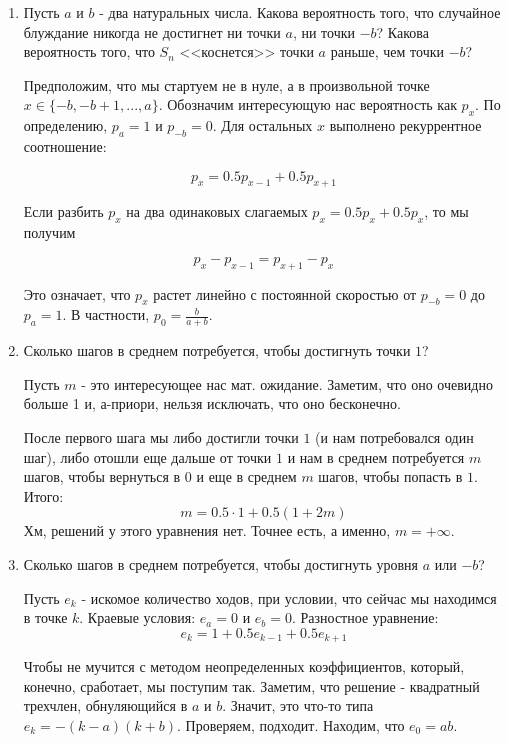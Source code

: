 {\begin{enumerate}
\item Пусть $a$ и $b$ - два натуральных числа. Какова вероятность того, что случайное блуждание никогда не достигнет ни точки $a$, ни точки $-b$? Какова вероятность того, что $S_{n}$ <<коснется>> точки $a$ раньше, чем точки $-b$? 

Предположим, что мы стартуем не в нуле, а в произвольной точке $ x\in\{-b,-b+1,..., a\} $. Обозначим интересующую нас вероятность как $ p_{x} $. По определению, $ p_{a}=1 $ и $ p_{-b}=0 $. Для остальных $ x $ выполнено рекуррентное соотношение: 

\[ p_{x}=0.5p_{x-1}+0.5p_{x+1} \]

Если разбить $ p_{x} $ на два одинаковых слагаемых $ p_{x}=0.5p_{x}+0.5p_{x} $, то мы получим 

\[ p_{x}-p_{x-1}=p_{x+1}-p_{x} \]

Это означает, что $ p_{x} $ растет линейно с постоянной скоростью от $ p_{-b}=0 $ до $ p_{a}=1 $. В частности, $ p_{0}=\frac{b}{a+b} $.


\item Сколько шагов в среднем потребуется, чтобы достигнуть точки $1$?

Пусть $m$ - это интересующее нас мат. ожидание. Заметим, что оно очевидно больше 1 и, а-приори, нельзя исключать, что оно бесконечно. 

После первого шага мы либо достигли точки $1$ (и нам потребовался один шаг), либо отошли еще дальше от точки $1$ и нам в среднем потребуется $m$ шагов, чтобы вернуться в $0$ и еще в среднем $m$ шагов, чтобы попасть в $1$. Итого:
\begin{equation}
m=0.5\cdot 1 + 0.5 (1 + 2m)
\end{equation}
Хм, решений у этого уравнения нет. Точнее есть, а именно, $m=+\infty$.

\item Сколько шагов в среднем потребуется, чтобы достигнуть уровня $a$ или $-b$?

Пусть $e_{k}$ - искомое количество ходов, при условии, что сейчас мы находимся в точке $k$. Краевые условия: $e_{a}=0$ и $e_{b}=0$. Разностное уравнение: 
\begin{equation}
e_{k}=1+0.5e_{k-1}+0.5e_{k+1}
\end{equation} 

Чтобы не мучится с методом неопределенных коэффициентов, который, конечно, сработает, мы поступим так. Заметим, что решение - квадратный трехчлен, обнуляющийся в $a$ и $b$. Значит, это что-то типа $e_{k}=-(k-a)(k+b)$. Проверяем, подходит. Находим, что $e_{0}=ab$.


\end{enumerate}}
